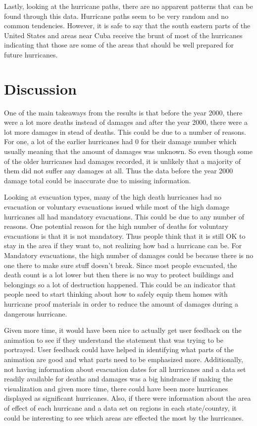 \evacuationTable

Lastly, looking at the hurricane paths, there are no apparent patterns that can be found through this data. Hurricane paths seem to be very random and no common tendencies. However, it is safe to say that the south eastern parts of the United States and areas near Cuba receive the brunt of most of the hurricanes indicating that those are some of the areas that should be well prepared for future hurricanes.

\section{Discussion}

One of the main takeaways from the results is that before the year 2000, there were a lot more deaths instead of damages and after the year 2000, there were a lot more damages in stead of deaths. This could be due to a number of reasons. For one, a lot of the earlier hurricanes had 0 for their damage number which usually meaning that the amount of damages was unknown. So even though some of the older hurricanes had damages recorded, it is unlikely that a majority of them did not suffer any damages at all. Thus the data before the year 2000 damage total could be inaccurate due to missing information.

Looking at evacuation types, many of the high death hurricanes had no evacuation or voluntary evacuations issued while most of the high damage hurricanes all had mandatory evacuations. This could be due to any number of reasons. One potential reason for the high number of deaths for voluntary evacuations is that it is not mandatory. Thus people think that it is still OK to stay in the area if they want to, not realizing how bad a hurricane can be. For Mandatory evacuations, the high number of damages could be because there is no one there to make sure stuff doesn't break. Since most people evacuated, the death count is a lot lower but then there is no way to protect buildings and belongings so a lot of destruction happened. This could be an indicator that people need to start thinking about how to safely equip them homes with hurricane proof materials in order to reduce the amount of damages during a dangerous hurricane. 

Given more time, it would have been nice to actually get user feedback on the animation to see if they understand the statement that was trying to be portrayed. User feedback could have helped in identifying what parts of the animation are good and what parts need to be emphasized more. Additionally, not having information about evacuation dates for all hurricanes and a data set readily available for deaths and damages was a big hindrance if making the visualization and given more time, there could have been more hurricanes displayed as significant hurricanes. Also, if there were information about the area of effect of each hurricane and a data set on regions in each state/country, it could be interesting to see which areas are effected the most by the hurricanes. 

